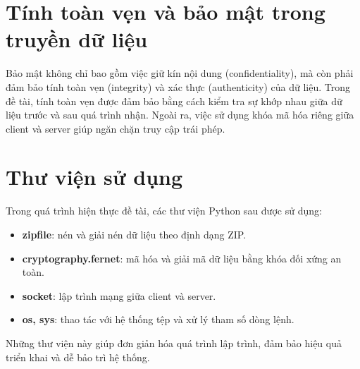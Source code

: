\section{Tính toàn vẹn và bảo mật trong truyền dữ liệu}

Bảo mật không chỉ bao gồm việc giữ kín nội dung (confidentiality), mà còn phải đảm bảo tính toàn vẹn (integrity) và xác thực (authenticity) của dữ liệu. Trong đề tài, tính toàn vẹn được đảm bảo bằng cách kiểm tra sự khớp nhau giữa dữ liệu trước và sau quá trình nhận. Ngoài ra, việc sử dụng khóa mã hóa riêng giữa client và server giúp ngăn chặn truy cập trái phép.

\section{Thư viện sử dụng}

Trong quá trình hiện thực đề tài, các thư viện Python sau được sử dụng:

\begin{itemize}
  \item \textbf{zipfile}: nén và giải nén dữ liệu theo định dạng ZIP.
  \item \textbf{cryptography.fernet}: mã hóa và giải mã dữ liệu bằng khóa đối xứng an toàn.
  \item \textbf{socket}: lập trình mạng giữa client và server.
  \item \textbf{os, sys}: thao tác với hệ thống tệp và xử lý tham số dòng lệnh.
\end{itemize}

Những thư viện này giúp đơn giản hóa quá trình lập trình, đảm bảo hiệu quả triển khai và dễ bảo trì hệ thống.
